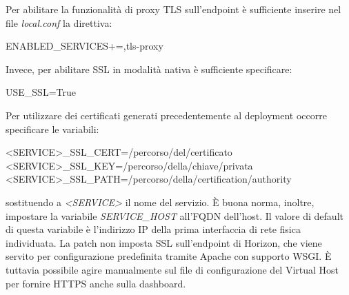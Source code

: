 \documentclass[../main.tex]{subfiles}
\begin{document}
Per abilitare la funzionalità di proxy TLS sull'endpoint è sufficiente inserire nel file \textit{local.conf} la direttiva:
\begin{python}
ENABLED_SERVICES+=,tls-proxy
\end{python}

Invece, per abilitare SSL in modalità nativa è sufficiente specificare:
\begin{python}
USE_SSL=True
\end{python}

Per utilizzare dei certificati generati precedentemente al deployment occorre specificare le variabili:
\begin{python}
<SERVICE>\_SSL_CERT=/percorso/del/certificato
<SERVICE>\_SSL_KEY=/percorso/della/chiave/privata
<SERVICE>\_SSL_PATH=/percorso/della/certification/authority
\end{python}
sostituendo a \textit{<SERVICE>} il nome del servizio.
\`E buona norma, inoltre, impostare la variabile \textit{SERVICE\_HOST} all'FQDN dell'host. Il valore di default di questa variabile è l'indirizzo IP della prima interfaccia di rete fisica individuata.
La patch non imposta SSL sull'endpoint di Horizon, che viene servito per configurazione predefinita tramite Apache con supporto WSGI.
\`E tuttavia possibile agire manualmente sul file di configurazione del Virtual Host per fornire HTTPS anche sulla dashboard.
\vfill
\end{document}
